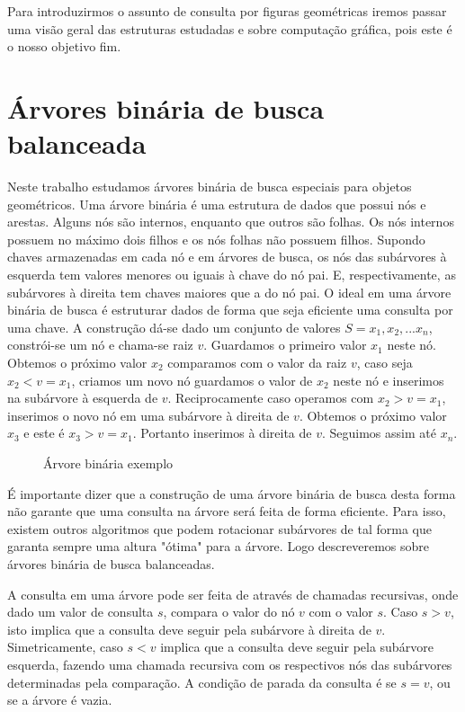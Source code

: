 Para introduzirmos o assunto de consulta por figuras geométricas iremos passar uma visão geral das estruturas estudadas e sobre computação gráfica, pois este é o nosso objetivo fim.

\section{Árvores binária de busca balanceada}
Neste trabalho estudamos árvores binária de busca especiais para objetos geométricos. Uma árvore binária é uma estrutura de dados que possui nós e arestas. Alguns nós são internos, enquanto que outros são folhas. Os nós internos possuem no máximo dois filhos e os nós folhas não possuem filhos. Supondo chaves armazenadas em cada nó e em árvores de busca, os nós das subárvores à esquerda tem valores menores ou iguais à chave do nó pai. E, respectivamente, as subárvores à direita tem chaves maiores que a do nó pai. O ideal em uma árvore binária de busca é estruturar dados de forma que seja eficiente uma consulta por uma chave. A construção dá-se dado um conjunto de valores $S = {x_1, x_2, ... x_n}$, constrói-se um nó e chama-se raiz $v$. Guardamos o primeiro valor $x_1$ neste nó. Obtemos o próximo valor $x_2$ comparamos com o valor da raiz $v$, caso seja $x_2 < v = x_1$, criamos um novo nó guardamos o valor de $x_2$ neste nó e inserimos na subárvore à esquerda de $v$. Reciprocamente caso operamos com $x_2 > v = x_1$, inserimos o novo nó em uma subárvore à direita de $v$. Obtemos o próximo valor $x_3$ e este é $x_3 > v = x_1$. Portanto inserimos à direita de $v$. Seguimos assim até $x_n$. 

\begin{figure}[h]
\centering
{}
\caption{Árvore binária exemplo}
\label{fig:14}
\end{figure}

É importante dizer que a construção de uma árvore binária de busca desta forma não garante que uma consulta na árvore será feita de forma eficiente. Para isso, existem outros algoritmos que podem rotacionar subárvores de tal forma que garanta sempre uma altura "ótima" para a árvore.  Logo descreveremos sobre árvores binária de busca balanceadas.

A consulta em uma árvore pode ser feita de através de chamadas recursivas, onde dado um valor de consulta $s$, compara o valor do nó $v$ com o valor $s$. Caso $s > v$, isto implica que a consulta deve seguir pela subárvore à direita de $v$. Simetricamente, caso $s < v$ implica que a consulta deve seguir pela subárvore esquerda, fazendo uma chamada recursiva com os respectivos nós das subárvores determinadas pela comparação. A condição de parada da consulta é se $s = v$, ou se a árvore é vazia.

